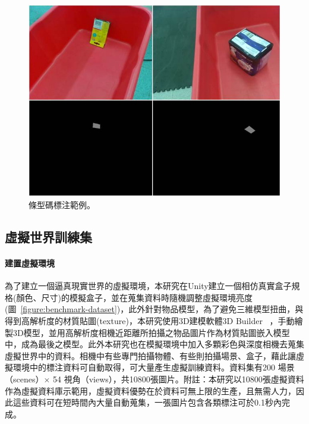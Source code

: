 \begin{figure}[H]
	\centering
	\includegraphics[height=!, width=0.8\linewidth, keepaspectratio=true]
	{./figures/barcode_label_example.jpg}
  \caption{條型碼標注範例。}
  \label{figure:barcode_label_example}
\end{figure}

\subsection{虛擬世界訓練集}
\paragraph{建置虛擬環境}
為了建立一個逼真現實世界的虛擬環境，本研究在Unity建立一個相仿真實盒子規格(顏色、尺寸)的模擬盒子，並在蒐集資料時隨機調整虛擬環境亮度(圖~\ref{figure:benchmark-dataset})，此外針對物品模型，為了避免三維模型扭曲，與得到高解析度的材質貼圖(texture)，本研究使用3D建模軟體3D Builder ~\cite{3DBuilder}，手動繪製3D模型，並用高解析度相機近距離所拍攝之物品圖片作為材質貼圖嵌入模型中，成為最後之模型。此外本研究也在模擬環境中加入多顆彩色與深度相機去蒐集虛擬世界中的資料。相機中有些專門拍攝物體、有些則拍攝場景、盒子，藉此讓虛擬環境中的標注資料可自動取得，可大量產生虛擬訓練資料。資料集有200 場景（scenes）$\times$ 54 視角（views），共10800張圖片。附註：本研究以10800張虛擬資料作為虛擬資料庫示範用，虛擬資料優勢在於資料可無上限的生產，且無需人力，因此這些資料可在短時間內大量自動蒐集，一張圖片包含各類標注可於0.1秒內完成。

